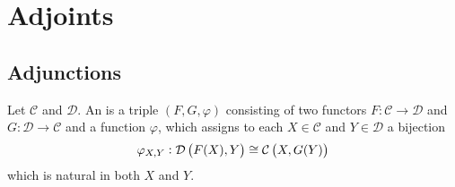 \section{Adjoints}
\subsection{Adjunctions}

\begin{definition}
	Let $\mathcal{C}$ and $\mathcal{D}$. An  is a triple $(F,G,\varphi)$ consisting of two functors $F : \mathcal{C} \to \mathcal{D}$ and $G : \mathcal{D} \to \mathcal{C}$ and a function $\varphi$, which assigns to each $X \in \mathcal{C}$ and $Y \in \mathcal{D}$ a bijection
	\begin{equation}
		\varphi_{X,Y} : \mathcal{D}\del[1]{F(X),Y} \cong \mathcal{C}\del[1]{X,G(Y)}
	\end{equation}
	\noindent which is natural in both $X$ and $Y$.
\end{definition}
